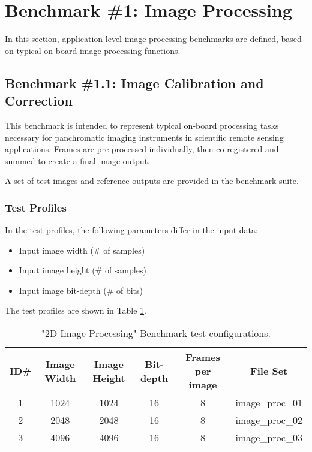 \section{Benchmark \#1: Image Processing}
In this section, application-level image processing benchmarks are defined, based on typical on-board image processing functions. 

\subsection{Benchmark \#1.1: Image Calibration and Correction}
This benchmark is intended to represent typical on-board processing tasks necessary for panchromatic imaging instruments in scientific remote sensing applications. Frames are pre-processed individually, then co-registered and summed to create a final image output. 

A set of test images and reference outputs are provided in the benchmark suite. 

\subsubsection{Test Profiles}

In the test profiles, the following parameters differ in the input data:

\begin{itemize}
    \item Input image width (\# of samples)
    \item Input image height (\# of samples)
    \item Input image bit-depth (\# of bits)
\end{itemize}

The test profiles are shown in Table \ref{tab:bm1_1_tests}.

\begin{table}[!h]
    \begin{tabular}{|c|c|c|c|c|c|}
        \hline
        ID\#        & Image Width           & Image Height          & Bit-depth         & Frames per image              & File Set          \\ \hline
        \hline
        1	        & 1024	                & 1024	                & 16	            & 8	                            & image\_proc\_01   \\ \hline
        2	        & 2048	                & 2048	                & 16	            & 8	                            & image\_proc\_02   \\ \hline
        3	        & 4096	                & 4096	                & 16	            & 8	                            & image\_proc\_03   \\ \hline
    \end{tabular}
    \caption{"2D Image Processing" Benchmark test configurations.}
    \label{tab:bm1_1_tests}
\end{table}

